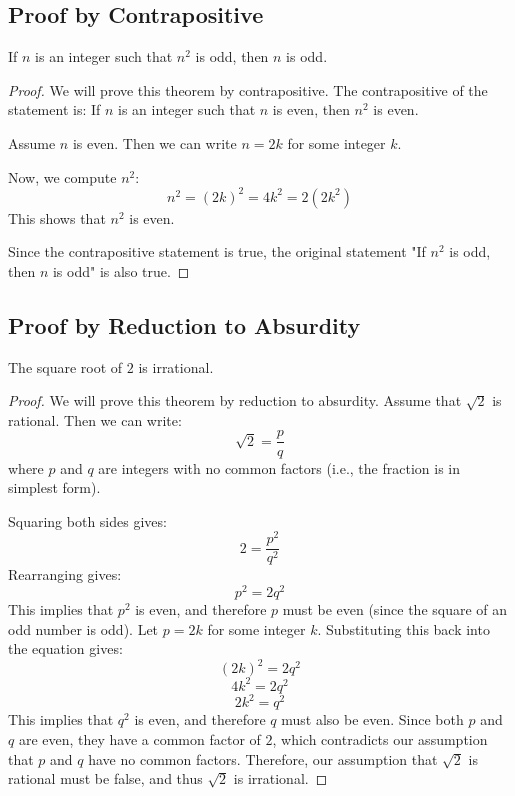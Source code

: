 \subsection{Proof by Contrapositive}    

    If \( n \) is an integer such that \( n^2 \) is odd, then \( n \) is odd.
  
\begin{proof}
    We will prove this theorem by contrapositive. The contrapositive of the statement is: If \( n \) is an integer such that \( n \) is even, then \( n^2 \) is even.

    Assume \( n \) is even. Then we can write \( n = 2k \) for some integer \( k \). 

    Now, we compute \( n^2 \):
    \[
    n^2 = (2k)^2 = 4k^2 = 2(2k^2)
    \]
    This shows that \( n^2 \) is even.

    Since the contrapositive statement is true, the original statement "If \( n^2 \) is odd, then \( n \) is odd" is also true.
\end{proof}
\subsection{Proof by Reduction to Absurdity}    

    The square root of \( 2 \) is irrational.   

\begin{proof}
    We will prove this theorem by reduction to absurdity. Assume that \( \sqrt{2} \) is rational. Then we can write:
    \[
    \sqrt{2} = \frac{p}{q}
    \]
    where \( p \) and \( q \) are integers with no common factors (i.e., the fraction is in simplest form).

    Squaring both sides gives:
    \[
    2 = \frac{p^2}{q^2}
    \]
    Rearranging gives:
    \[
    p^2 = 2q^2
    \]
    This implies that \( p^2 \) is even, and therefore \( p \) must be even (since the square of an odd number is odd).
    Let \( p = 2k \) for some integer \( k \). Substituting this back into the equation gives:
    \[
    (2k)^2 = 2q^2   
    \]
    \[
    4k^2 = 2q^2
    \]
    \[
    2k^2 = q^2
    \]
    This implies that \( q^2 \) is even, and therefore \( q \) must also be even.   
    Since both \( p \) and \( q \) are even, they have a common factor of \( 2 \), which contradicts our assumption that \( p \) and \( q \) have no common factors.
    Therefore, our assumption that \( \sqrt{2} \) is rational must be false, and thus \( \sqrt{2} \) is irrational.
\end{proof}

